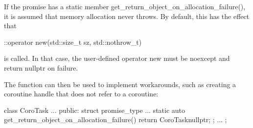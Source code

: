 
If the promise has a static member get\_return\_object\_on\_allocation\_failure(), it is assumed that memory allocation never throws. By default, this has the effect that

\begin{cpp}
::operator new(std::size_t sz, std::nothrow_t)
\end{cpp}

is called. In that case, the user-defined operator new must be noexcept and return nullptr on failure.

The function can then be used to implement workarounds, such as creating a coroutine handle that does not refer to a coroutine:

\begin{cpp}
class CoroTask {
	...
	public:
	struct promise_type {
		...
		static auto get_return_object_on_allocation_failure() {
			return CoroTask{nullptr};
		}
	};
	...
};
\end{cpp}






























